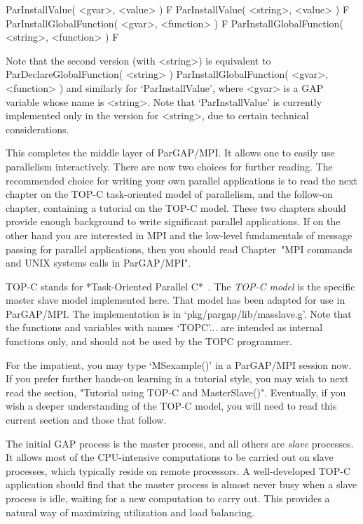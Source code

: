 \>ParInstallValue( <gvar>, <value> ) F
\>ParInstallValue( <string>, <value> ) F
\>ParInstallGlobalFunction( <gvar>, <function> ) F
\>ParInstallGlobalFunction( <string>, <function> ) F

Note that the second version (with <string>) is equivalent to
\begintt
ParDeclareGlobalFunction( <string> )
ParInstallGlobalFunction( <gvar>, <function> )
\endtt
and similarly for `ParInstallValue',
where <gvar> is a GAP variable whose name is <string>.
Note that `ParInstallValue' is currently implemented only in the
version for <string>, due to certain technical considerations.

This completes the middle layer of ParGAP/MPI.  It allows one to easily
use parallelism interactively.  There are now two choices for further reading.
The recommended choice for writing your own parallel applications is to
read the next chapter on the TOP-C task-oriented model of parallelism, and
the follow-on chapter, containing a tutorial on the TOP-C model.
These two chapters should provide enough background to write
significant parallel applications.  If on the other hand you are
interested in MPI and the low-level fundamentals of message passing
for parallel applications, then you should read Chapter~"MPI commands
and UNIX systems calls in ParGAP/MPI".


TOP-C stands for *Task-Oriented Parallel C*~\cite{Coo96}.  The {\it
TOP-C model} is the specific master slave model implemented here.
That model has been adapted for use in ParGAP/MPI.  The implementation
is in `pkg/pargap/lib/masslave.g'.  Note that the functions and
variables with names `TOPC'... are intended as internal functions only,
and should not be used by the TOPC programmer.

For the impatient, you may type `MSexample()' in a ParGAP/MPI session
now.  If you prefer further hands-on learning in a tutorial style, you
may wish to next read the section, "Tutorial using TOP-C and
MasterSlave()".  Eventually, if you wish a deeper understanding of the
TOP-C model, you will need to read this current section and those that
follow.

The initial GAP process is the master process, and all others are {\it
slave} processes.  It allows most of the CPU-intensive computations to
be carried out on slave processes, which typically reside on remote
processors.  A well-developed TOP-C application should find that the
master process is almost never busy when a slave process is idle,
waiting for a new computation to carry out.  This provides a natural
way of maximizing utilization and load balancing.

